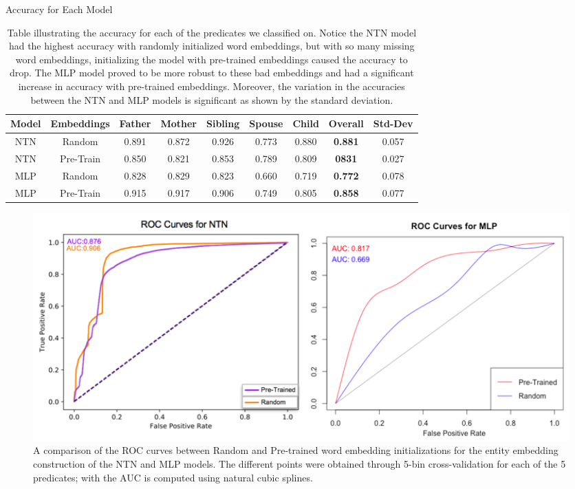 \documentclass[11.5pt]{article}
\newcounter{graphics}
\begin{document}
 \begin{table}[h!]
\begin{center}
\begin{large}
Accuracy for Each Model
\end{large}
\begin{tabular}{|cc|ccccc||cc|}
\hline
\textbf{Model} & \textbf{Embeddings} & \textbf{Father} & \textbf{Mother} & \textbf{Sibling} & \textbf{Spouse} & \textbf{Child} & \textbf{ Overall} & \textbf{Std-Dev}\\
\hline
NTN & Random 		&	0.891 	& 0.872 	& 0.926	&	0.773	&  0.880	& \textbf{0.881}	 & 0.057	\\
NTN & Pre-Train 		&	0.850 	& 0.821 	&	0.853	& 0.789	& 0.809 	& \textbf{0831}	& 0.027	\\

MLP & Random 		& 0.828 & 0.829 & 0.823 & 0.660 & 0.719 &  \textbf{0.772}	& 0.078	\\
MLP & Pre-Train 		& 0.915 & 0.917 & 0.906 & 0.749 & 0.805 & \textbf{0.858}	& 0.077	\\
\hline
\end{tabular}
\end{center}
  \caption{\small Table illustrating the accuracy for each of the predicates we classified on. Notice the NTN model had the highest accuracy with randomly initialized word embeddings, but with so many missing word embeddings, initializing the model with pre-trained embeddings caused the accuracy to drop. The MLP model proved to be more robust to these bad embeddings and had a significant increase in accuracy with pre-trained embeddings.  Moreover, the variation in the accuracies between the NTN and MLP models is significant as shown by the standard deviation. }
  \label{accuracy}
\end{table}

\begin{figure}[h!]
\centerline{\includegraphics[width=1\textwidth]{report_mlp/ROC-Curves.png}}
  \caption{\small  A comparison of the ROC curves between Random and Pre-trained word embedding initializations  for the entity embedding construction of the NTN and MLP models. The different points were obtained through 5-bin cross-validation for each of the 5 predicates; with the AUC is computed using natural cubic splines. }
\label{ROC-Curve}
\end{figure}
\end{document}
